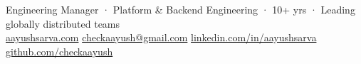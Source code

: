 \documentclass[]{AayushSarva}
\begin{document}
%
%
\lastupdated

%
%


{
  {\color{subheadings}Engineering Manager · Platform \& Backend Engineering · 10+ yrs · Leading globally distributed teams}\\[3pt]
  {\fontsize{10pt}{12pt}\selectfont
  \faGlobe\enspace\href{https://aayushsarva.com}{aayushsarva.com}\hspace{1em}%
  \faEnvelope\enspace\href{mailto:checkaayush@gmail.com}{checkaayush@gmail.com}\hspace{1em}%
  \faLinkedin\enspace\href{https://www.linkedin.com/in/aayushsarva}{linkedin.com/in/aayushsarva}\hspace{1em}%
  \faGithub\enspace\href{https://github.com/checkaayush}{github.com/checkaayush}}
}

%
%
\end{document}
